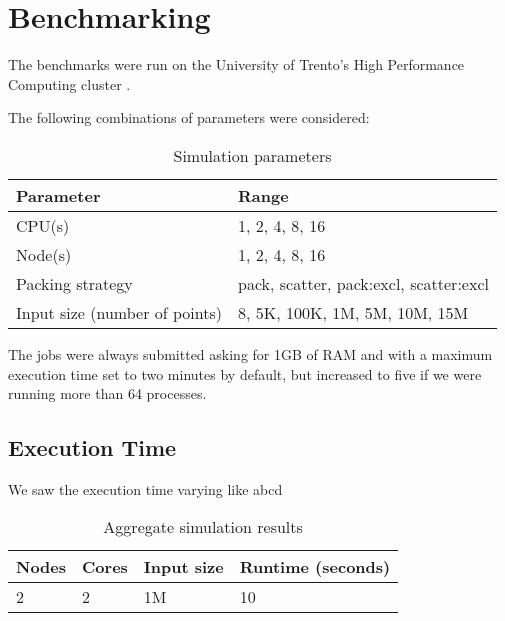 \section{Benchmarking}
\label{sec:benchmarking}

The benchmarks were run on the University of Trento's High Performance Computing cluster
.

The following combinations of parameters were considered:

\begin{table}[ht]
    \centering
    \caption{Simulation parameters}
    \begin{tabular}{l|l}
        \hline
        Parameter                     & Range                                    \\
        \hline
        CPU(s)                        & {1, 2, 4, 8, 16}                         \\
        Node(s)                       & {1, 2, 4, 8, 16}                         \\
        Packing strategy              & {pack, scatter, pack:excl, scatter:excl} \\
        Input size (number of points) & {8, 5K, 100K, 1M, 5M, 10M, 15M }         \\
        \hline
    \end{tabular}
\end{table}

The jobs were always submitted asking for 1GB of RAM and with a maximum execution time set to two minutes by default, but increased to five if we were running more than 64 processes.


\subsection{Execution Time}

We saw the execution time varying like abcd
\begin{table}[ht]
    \centering
    \caption{Aggregate simulation results}
    \begin{tabular}{l|l|l|l}
        \hline
        Nodes & Cores & Input size & Runtime (seconds) \\
        \hline
        2     & 2     & 1M         & 10                \\
        \hline
    \end{tabular}
\end{table}

